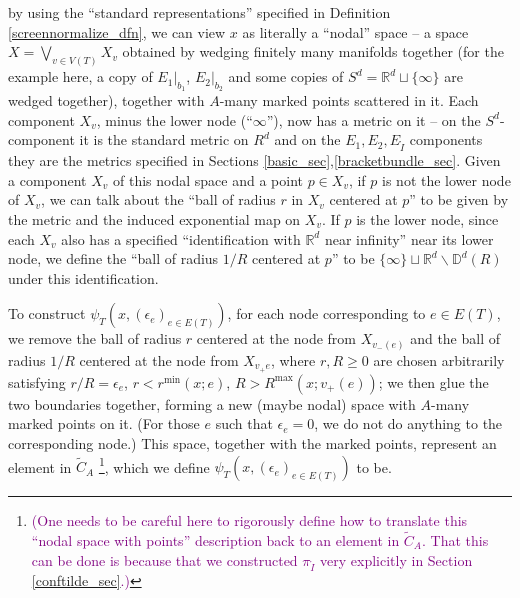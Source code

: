 \documentclass[11pt]{article}
\theoremstyle{definition}
\theoremstyle{remark}
\def\wt#1{\widetilde{#1}}
\def\mr#1{{\mathring{#1}}}
\def\R{\mathbb{R}}
\def\D{\mathbb{D}}
\def\cmt#1{\textcolor{purple}{(#1)}}
\begin{document}
by using the ``standard representations'' specified in Definition \ref{screennormalize_dfn}, 
we can view $x$ as literally a ``nodal'' space -- a space $X=\bigvee_{v\in V(T)}X_v$ obtained by wedging finitely many manifolds together (for the example here, a copy of $E_1|_{b_1}$, $E_2|_{b_2}$ and some copies of $S^d=\R^d\sqcup\{\infty\}$ are wedged together), together with $A$-many marked points scattered in it. 
Each component $X_v$, minus the lower node (``$\infty$''), now has a metric on it -- on the $S^d$-component it is the standard metric on $R^d$ and on the $E_1,E_2,E_{\mr{I}}$ components they are the metrics specified in Sections \ref{basic_sec},\ref{bracketbundle_sec}. 
Given a component $X_v$ of this nodal space and a point $p\in X_v$, if $p$ is not the lower node of $X_v$, we can talk about the ``ball of radius $r$ in $X_v$ centered at $p$'' to be given by the metric and the induced exponential map on $X_v$. 
If $p$ is the lower node, since each $X_v$ also has a specified ``identification with $\R^d$ near infinity'' near its lower node, we define the ``ball of radius $1/R$ centered at $p$'' to be $\{\infty\}\sqcup\R^d\backslash\D^d(R)$ under this identification. 

To construct $\psi_T(x,(\epsilon_e)_{e\in E(T)})$, 
for each node corresponding to $e\in E(T)$, we remove the ball of radius $r$ centered at the node from $X_{v_-(e)}$ and the ball of radius $1/R$ centered at the node from $X_{v_+e}$, where $r,R\ge0$ are chosen arbitrarily satisfying $r/R=\epsilon_e$, $r<r^{\min}(x;e)$, $R>R^{\max}(x;v_+(e))$; 
we then glue the two boundaries together, forming a new (maybe nodal) space with $A$-many marked points on it.
(For those $e$ such that $\epsilon_e=0$, we do not do anything to the corresponding node.) 
This space, together with the marked points, represent an element in $\wt{C}_A$
\footnote{
\cmt{One needs to be careful here to rigorously define how to translate this ``nodal space with points'' description back to an element in $\wt{C}_A$. That this can be done is because that we constructed $\pi_{\mr{I}}$ very explicitly in Section \ref{conftilde_sec}.}
}, which we define $\psi_T(x,(\epsilon_e)_{e\in E(T)})$ to be. 
\end{document}
